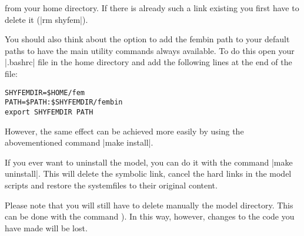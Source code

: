 from your home directory. If there is already such a link existing you
first have to delete it (|rm shyfem|).

You should also think about the option to add the fembin path to your
default paths to have the main utility commands always available. To do
this open your |.bashrc| file in the home directory and add the following
lines at the end of the file:

\begin{verbatim}
SHYFEMDIR=$HOME/fem
PATH=$PATH:$SHYFEMDIR/fembin
export SHYFEMDIR PATH
\end{verbatim}

However, the same effect can be achieved more easily by using the
abovementioned command |make install|.

If you ever want to uninstall the model, you can do it with the command
|make uninstall|. This will delete the symbolic link, cancel the hard
links in the model scripts and restore the systemfiles \ttt{\sysfiles}
to their original content.

Please note that you will still have to delete manually the model
directory. This can be done with the command ). In
this way, however, changes to the code you have made will be lost.

